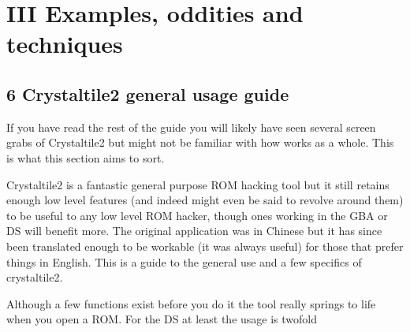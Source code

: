 \documentclass[
]{book}
\begin{document}
\hypertarget{part-iii-examples-oddities-and-techniques}{%
\part{III Examples, oddities and techniques}\label{part-iii-examples-oddities-and-techniques}}

\hypertarget{crystaltile2-general-usage-guide}{%
\chapter{6 Crystaltile2 general usage guide}\label{crystaltile2-general-usage-guide}}

If you have read the rest of the guide you will likely have seen several screen grabs of Crystaltile2 but might not be familiar with how works as a whole. This is what this section aims to sort.

Crystaltile2 is a fantastic general purpose ROM hacking tool but it still retains enough low level features (and indeed might even be said to revolve around them) to be useful to any low level ROM hacker, though ones working in the GBA or DS will benefit more. The original application was in Chinese but it has since been translated enough to be workable (it was always useful) for those that prefer things in English. This is a guide to the general use and a few specifics of crystaltile2.

Although a few functions exist before you do it the tool really springs to life when you open a ROM. For the DS at least the usage is twofold
\end{document}
